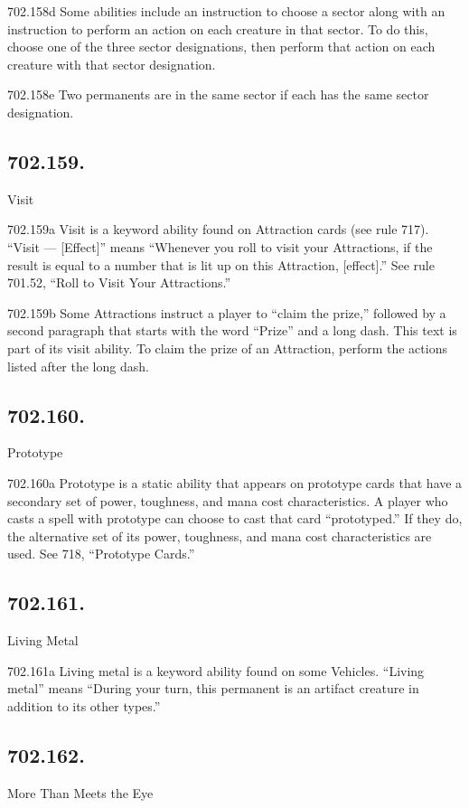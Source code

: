 702.158d Some abilities include an instruction to choose a sector along with an instruction to perform an action on each creature in that sector. To do this, choose one of the three sector designations, then perform that action on each creature with that sector designation.

702.158e Two permanents are in the same sector if each has the same sector designation.

\subsection*{702.159.}
Visit

702.159a Visit is a keyword ability found on Attraction cards (see rule 717). “Visit — [Effect]” means “Whenever you roll to visit your Attractions, if the result is equal to a number that is lit up on this Attraction, [effect].” See rule 701.52, “Roll to Visit Your Attractions.”

702.159b Some Attractions instruct a player to “claim the prize,” followed by a second paragraph that starts with the word “Prize” and a long dash. This text is part of its visit ability. To claim the prize of an Attraction, perform the actions listed after the long dash.

\subsection*{702.160.}
Prototype

702.160a Prototype is a static ability that appears on prototype cards that have a secondary set of power, toughness, and mana cost characteristics. A player who casts a spell with prototype can choose to cast that card “prototyped.” If they do, the alternative set of its power, toughness, and mana cost characteristics are used. See 718, “Prototype Cards.”

\subsection*{702.161.}
Living Metal

702.161a Living metal is a keyword ability found on some Vehicles. “Living metal” means “During your turn, this permanent is an artifact creature in addition to its other types.”

\subsection*{702.162.}
More Than Meets the Eye

